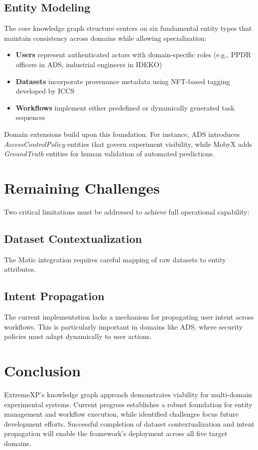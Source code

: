 \documentclass[12pt, a4paper]{article}
\begin{document}
\subsection{Entity Modeling}
The core knowledge graph structure centers on six fundamental entity types that maintain consistency across domains while allowing specialization:

\begin{itemize}
    \item \textbf{Users} represent authenticated actors with domain-specific roles (e.g., PPDR officers in ADS, industrial engineers in IDEKO)
    \item \textbf{Datasets} incorporate provenance metadata using NFT-based tagging developed by ICCS
    \item \textbf{Workflows} implement either predefined or dynamically generated task sequences
\end{itemize}

Domain extensions build upon this foundation. For instance, ADS introduces \emph{AccessControlPolicy} entities that govern experiment visibility, while MobyX adds \emph{GroundTruth} entities for human validation of automated predictions.

\section{Remaining Challenges}
Two critical limitations must be addressed to achieve full operational capability:

\subsection{Dataset Contextualization}
The Matic integration requires careful mapping of raw datasets to entity attributes. 

\subsection{Intent Propagation}
The current implementation lacks a mechanism for propagating user intent across workflows. This is particularly important in domains like ADS, where security policies must adapt dynamically to user actions.

\section{Conclusion}
ExtremeXP's knowledge graph approach demonstrates viability for multi-domain experimental systems. Current progress establishes a robust foundation for entity management and workflow execution, while identified challenges focus future development efforts. Successful completion of dataset contextualization and intent propagation will enable the framework's deployment across all five target domains.
\end{document}
